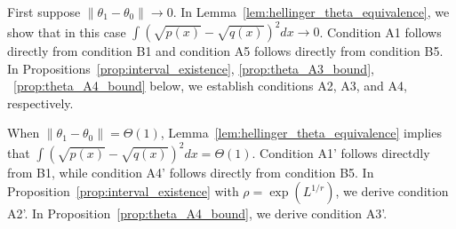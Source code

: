 \documentclass{article}
\begin{document}


First suppose $\| \theta_1 - \theta_0 \| \rightarrow 0$. In Lemma~\ref{lem:hellinger_theta_equivalence}, we show that in this case $\int (\sqrt{p(x)} - \sqrt{q(x)})^2 dx \rightarrow 0$. Condition A1 follows directly from condition B1 and condition A5 follows directly from condition B5. In Propositions~\ref{prop:interval_existence}, \ref{prop:theta_A3_bound}, ~\ref{prop:theta_A4_bound} below, we establish conditions A2, A3, and A4, respectively.

When $\| \theta_1 - \theta_0 \| = \Theta(1)$, Lemma~\ref{lem:hellinger_theta_equivalence} implies that $\int (\sqrt{p(x)} - \sqrt{q(x)})^2 dx = \Theta(1)$. Condition A1' follows directdly from B1, while condition A4' follows directly from condition B5. In Proposition~\ref{prop:interval_existence} with $\rho = \exp(L^{1/r})$, we derive condition A2'. In Proposition~\ref{prop:theta_A4_bound}, we derive condition A3'.
\end{document}
